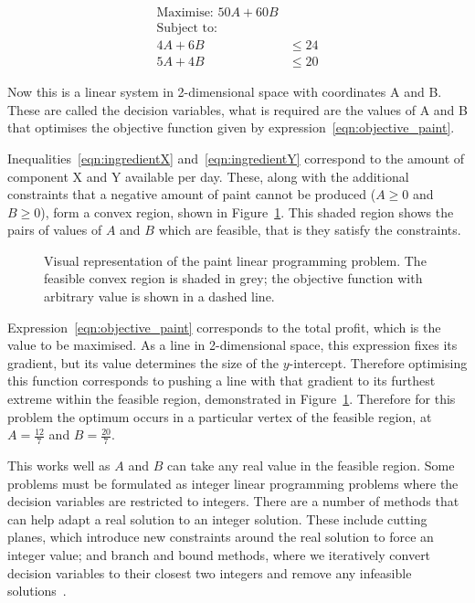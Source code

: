 \begin{align}
\text{Maximise: } 50 A + 60 B & \label{eqn:objective_paint} \\
\text{Subject to: } & \nonumber \\
4 A + 6 B &\leq 24 \label{eqn:ingredientX} \\
5 A + 4 B &\leq 20 \label{eqn:ingredientY}
\end{align}

Now this is a linear system in 2-dimensional space with coordinates A and B.
These are called the decision variables, what is required are the values of A
and B that optimises the objective function given by
expression~\ref{eqn:objective_paint}.

Inequalities~\ref{eqn:ingredientX} and~\ref{eqn:ingredientY} correspond to the
amount of component X and Y available per day. These, along with the additional
constraints that a negative amount of paint cannot be produced (\(A \geq 0\) and
\(B \geq 0\)), form a convex region, shown in Figure~\ref{fig:paint_lp}.
This shaded region shows the pairs of values of \(A\) and \(B\) which are
feasible, that is they satisfy the constraints.

\begin{figure}
\begin{center}

\end{center}
\caption{Visual representation of the paint linear programming problem. The feasible convex
region is shaded in grey; the objective function with arbitrary value is shown
in a dashed line.}
\label{fig:paint_lp}
\end{figure}

Expression~\ref{eqn:objective_paint} corresponds to the total profit, which is
the value to be maximised. As a line in 2-dimensional space,
this expression fixes its gradient, but its value determines the size of the
\(y\)-intercept. Therefore optimising this function corresponds to pushing a line
with that gradient to its furthest extreme within the feasible region,
demonstrated in Figure~\ref{fig:paint_lp}.
Therefore for this problem the optimum occurs in a particular vertex of the
feasible region, at \(A = \frac{12}{7}\) and \(B = \frac{20}{7}\).

This works well as \(A\) and \(B\) can take any real value in the feasible region.
Some problems must be formulated as integer linear programming problems where the decision
variables are restricted to integers. There are a number of methods that can
help adapt a real solution to an integer solution. These include cutting
planes, which introduce new constraints around the real solution to force an
integer value; and branch and bound methods, where we iteratively convert
decision variables to their closest two integers and remove any infeasible
solutions~\cite{conforti2014integer}.

